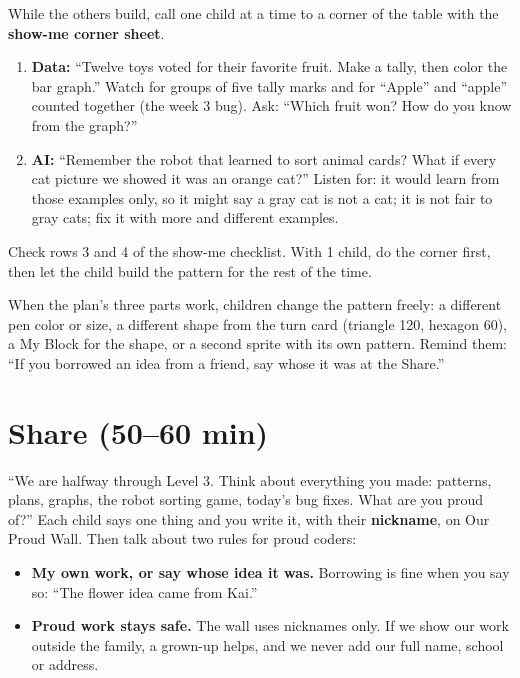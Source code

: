 \begin{teachernote}
While the others build, call one child at a time to a corner of the table with the \textbf{show-me corner sheet}.
\begin{enumerate}[leftmargin=1.4em,itemsep=1pt]
  \item \textbf{Data:} \enquote{Twelve toys voted for their favorite fruit. Make a tally, then color the bar graph.} Watch for groups of five tally marks and for \enquote{Apple} and \enquote{apple} counted together (the week 3 bug). Ask: \enquote{Which fruit won? How do you know from the graph?}
  \item \textbf{AI:} \enquote{Remember the robot that learned to sort animal cards? What if every cat picture we showed it was an orange cat?} Listen for: it would learn from those examples only, so it might say a gray cat is not a cat; it is not fair to gray cats; fix it with more and different examples.
\end{enumerate}
Check rows 3 and 4 of the show-me checklist. With 1 child, do the corner first, then let the child build the pattern for the rest of the time.
\end{teachernote}

\begin{freebuild}
When the plan's three parts work, children change the pattern freely: a different pen color or size, a different shape from the turn card (triangle 120, hexagon 60), a My Block for the shape, or a second sprite with its own pattern. Remind them: \enquote{If you borrowed an idea from a friend, say whose it was at the Share.}
\end{freebuild}

\section{Share (50--60 min)}
\begin{safety}
\enquote{We are halfway through Level 3. Think about everything you made: patterns, plans, graphs, the robot sorting game, today's bug fixes. What are you proud of?} Each child says one thing and you write it, with their \textbf{nickname}, on Our Proud Wall. Then talk about two rules for proud coders:
\begin{itemize}[leftmargin=1.2em,itemsep=0pt]
  \item \textbf{My own work, or say whose idea it was.} Borrowing is fine when you say so: \enquote{The flower idea came from Kai.}
  \item \textbf{Proud work stays safe.} The wall uses nicknames only. If we show our work outside the family, a grown-up helps, and we never add our full name, school or address.
\end{itemize}
\end{safety}

